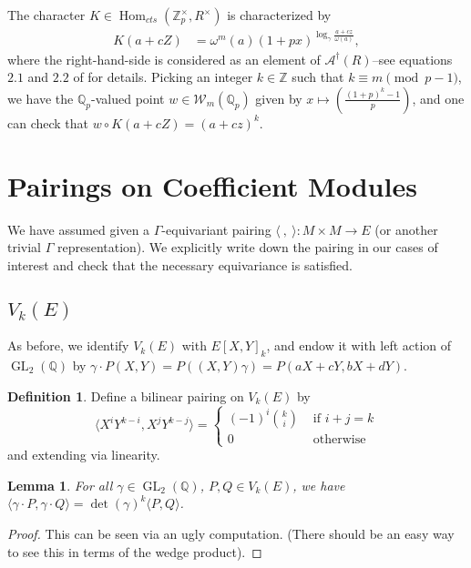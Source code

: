 \documentclass[10pt]{amsart}
\theoremstyle{plain}
\newtheorem{lemma}[theorem]{Lemma}
\theoremstyle{definition}
\newtheorem{definition}[theorem]{Definition}
\newcommand{\ZZ}{{\mathbb{Z}}}
\newcommand{\QQ}{{\mathbb{Q}}}
\newcommand{\cA}{\mathcal{A}}
\newcommand{\cW}{\mathcal{W}}
\DeclareMathOperator{\Hom}{Hom}
\DeclareMathOperator{\GL}{GL}
\begin{document}
The character $K\in\Hom_{cts}(\ZZ_p^\times,R^\times)$ is characterized by
\begin{align*}
	K(a+cZ)  &= \omega^m(a) (1+px)^{\log_\gamma\frac{a+cz}{\omega(a)}},
\end{align*}
where the right-hand-side is considered as an element of $\cA^\dagger(R)$--see equations $2.1$ and $2.2$ of \cite{Robs} for details. Picking an integer $k\in\ZZ$ such that $k\equiv m\pmod{p-1}$, we have the $\QQ_p$-valued point $w\in \cW_m(\QQ_p)$ given by $x\mapsto \left(\frac{(1+p)^k-1}{p}\right)$, and one can check that $w\circ K (a+cZ) = (a+cz)^k$.



\section{Pairings on Coefficient Modules} \label{sec:coeff_pairing}

We have assumed given a $\Gamma$-equivariant pairing $\langle~,~ \rangle : M \times M \longrightarrow E$ (or another trivial $\Gamma$ representation). We explicitly write down the pairing in our cases of interest and check that the necessary equivariance is satisfied. 

\subsection{$V_k(E)$}

As before, we identify $V_k(E)$ with $E[X,Y]_k$, and endow it with left action of $\GL_2(\QQ)$ by $\gamma \cdot P(X,Y) = P((X,Y)\gamma)=P(aX+cY,bX+dY).$ 
\begin{definition}
Define a bilinear pairing on $V_k(E)$ by
\begin{equation*}
	\langle X^iY^{k-i}, X^j Y^{k-j} \rangle = \begin{cases} (-1)^i {k \choose i} & \text{ if } i+j=k\\
												0	& \text{ otherwise} \end{cases}
\end{equation*}
and extending via linearity.
\end{definition}


\begin{lemma}
For all $\gamma\in \GL_2(\QQ)$, $P,Q\in V_k(E)$, we have $\langle \gamma\cdot P,\gamma \cdot Q\rangle = \det(\gamma)^k \langle P,Q\rangle$.
\end{lemma}
\begin{proof}
This can be seen via an ugly computation. (There should be an easy way to see this in terms of the wedge product).
\end{proof}
\end{document}
